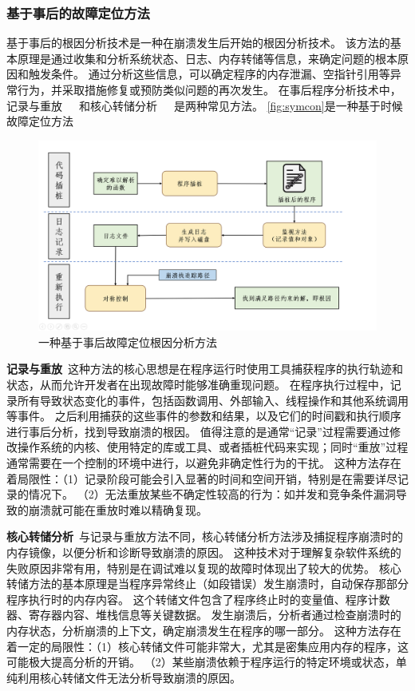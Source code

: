\subsubsection{基于事后的故障定位方法}
基于事后的根因分析技术是一种在崩溃发生后开始的根因分析技术。
该方法的基本原理是通过收集和分析系统状态、日志、内存转储等信息，来确定问题的根本原因和触发条件。
通过分析这些信息，可以确定程序的内存泄漏、空指针引用等异常行为，并采取措施修复或预防类似问题的再次发生。
在事后程序分析技术中，记录与重放~\cite{ReCrash2008}~\cite{SymCrash2014}~\cite{Chronicler2013}和核心转储分析~\cite{RETracer2016}~\cite{Making2015}~\cite{CREDAL2016}是两种常见方法。
\autoref{fig:symcon}是一种基于时候故障定位方法~\cite{SymCrash2014}
\begin{figure}[h]
    \centering
    \includegraphics[width=1.0\textwidth]{./figure/Symcon.png}
    \caption{一种基于事后故障定位根因分析方法}
    \label{fig:symcon}
\end{figure}


\textbf{记录与重放}\ 这种方法的核心思想是在程序运行时使用工具捕获程序的执行轨迹和状态，从而允许开发者在出现故障时能够准确重现问题。
在程序执行过程中，记录所有导致状态变化的事件，包括函数调用、外部输入、线程操作和其他系统调用等事件。
之后利用捕获的这些事件的参数和结果，以及它们的时间戳和执行顺序进行事后分析，找到导致崩溃的根因。
值得注意的是通常“记录”过程需要通过修改操作系统的内核、使用特定的库或工具、或者插桩代码来实现；同时“重放”过程通常需要在一个控制的环境中进行，以避免非确定性行为的干扰。
这种方法存在着局限性：（1）记录阶段可能会引入显著的时间和空间开销，特别是在需要详尽记录的情况下。
（2）无法重放某些不确定性较高的行为：如并发和竞争条件漏洞导致的崩溃就可能在重放时难以精确复现。

\textbf{核心转储分析}\ 与记录与重放方法不同，核心转储分析方法涉及捕捉程序崩溃时的内存镜像，以便分析和诊断导致崩溃的原因。
这种技术对于理解复杂软件系统的失败原因非常有用，特别是在调试难以复现的故障时体现出了较大的优势。
核心转储方法的基本原理是当程序异常终止（如段错误）发生崩溃时，自动保存那部分程序执行时的内存内容。
这个转储文件包含了程序终止时的变量值、程序计数器、寄存器内容、堆栈信息等关键数据。
发生崩溃后，分析者通过检查崩溃时的内存状态，分析崩溃的上下文，确定崩溃发生在程序的哪一部分。
这种方法存在着一定的局限性：（1）核心转储文件可能非常大，尤其是密集应用内存的程序，这可能极大提高分析的开销。
（2）某些崩溃依赖于程序运行的特定环境或状态，单纯利用核心转储文件无法分析导致崩溃的原因。


